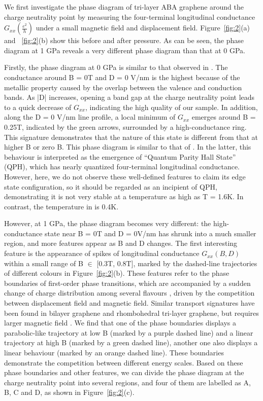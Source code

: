 We first investigate the phase diagram of tri-layer ABA graphene around the charge neutrality point by measuring the four-terminal longitudinal conductance $G_{xx}(\frac{e^2}{h})$ 
under a small magnetic field and displacement field. Figure~\ref{fig:2}(a) and ~\ref{fig:2}(b) show this before and after pressure. 
As can be seen, the phase diagram at 1 GPa reveals a very different phase diagram than that at 0 GPa.

Firstly, the phase diagram at 0 GPa is similar to that observed in \cite{stepanov2019quantum}. 
The conductance around B = 0T and D = 0 V/nm is the highest because of the metallic property caused by the overlap between the valence and conduction bands. 
As |D| increases, opening a band gap at the charge neutrality point leads to a quick decrease of $G_{xx}$, indicating the high quality of our sample. 
In addition, along the D = 0 V/nm line profile, a local minimum of $G_{xx}$ emerges around B = 0.25T, indicated by the green arrows, surrounded by a high-conductance ring. 
This signature demonstrates that the nature of this state is different from that at higher B or zero B.
This phase diagram is similar to that of \cite{stepanov2019quantum}.
In the latter, this behaviour is interpreted as the emergence of “Quantum Parity Hall State” (QPH), which has nearly quantized four-terminal longitudinal conductance. 
However, here, we do not observe these well-defined features to claim its edge state configuration, so it should be regarded as an incipient of QPH, 
demonstrating it is not very stable at a temperature as high as T = 1.6K. In contrast, the temperature in \cite{stepanov2019quantum} is 0.4K.

However, at 1 GPa, the phase diagram becomes very different: the high-conductance state near B = 0T and D = 0V/nm has shrunk into a much smaller region, and more features appear as B and D changes. 
The first interesting feature is the appearance of spikes of longitudinal conductance $G_{xx}(B, D)$ within a small range of B $\in$ [0.3T, 0.8T], 
marked by the dashed-line trajectories of different colours in Figure~\ref{fig:2}(b). 
These features refer to the phase boundaries of first-order phase transitions, which are accompanied by a sudden change of charge distribution among several flavours \cite{zondiner2020cascade}, 
driven by the competition between displacement field and magnetic field. 
Similar transport signatures have been found in bilayer graphene and rhombohedral tri-layer graphene, 
but requires larger magnetic field \cite{geisenhof2021quantum, weitz2010broken, maher2013evidence, winterer2023ferroelectric}. 
We find that one of the phase boundaries displays a parabolic-like trajectory at low B (marked by a purple dashed line) and a linear trajectory at high B (marked by a green dashed line), 
another one also displays a linear behaviour (marked by an orange dashed line). 
These boundaries demonstrate the competition between different energy scales. 
Based on these phase boundaries and other features, we can divide the phase diagram at the charge neutrality point into several regions, 
and four of them are labelled as A, B, C and D, as shown in Figure~\ref{fig:2}(c).

